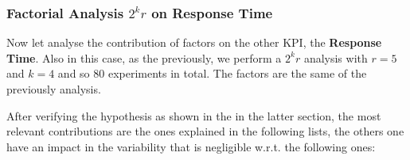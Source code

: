 \subsubsection{Factorial Analysis $2^kr$ on Response Time}
Now let analyse the contribution of factors on the other KPI, the \textbf{Response Time}. Also in this case, as the previously, we perform a $2^kr$ analysis with $r=5$ and $k=4$ and so 80 experiments in total. The factors are the same of the previously analysis.

\noindent %




\noindent After verifying the hypothesis as shown in the in the latter section, the most relevant contributions are the ones explained in the following lists, the others one have an impact in the variability that is negligible w.r.t. the following ones: 

